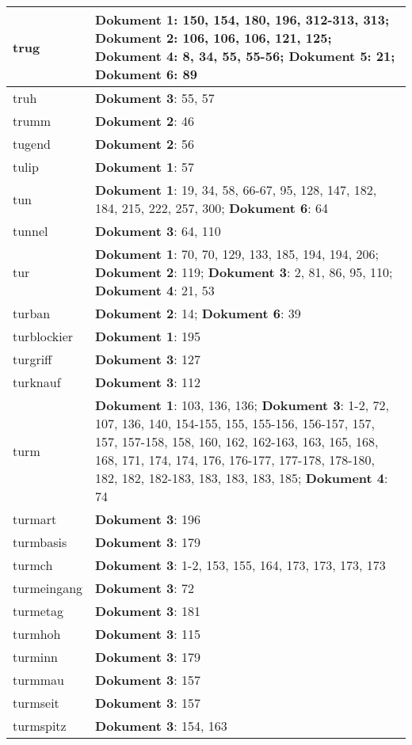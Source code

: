 \documentclass[a5paper]{article}
\begin{document}
\begin{longtable}[l]{|l|p{3in}|}
\hline
trug & \textbf{Dokument 1}: 150, 154, 180, 196, 312-313, 313; \textbf{Dokument 2}: 106, 106, 106, 121, 125; \textbf{Dokument 4}: 8, 34, 55, 55-56; \textbf{Dokument 5}: 21; \textbf{Dokument 6}: 89 \\
\hline
truh & \textbf{Dokument 3}: 55, 57 \\
\hline
trumm & \textbf{Dokument 2}: 46 \\
\hline
tugend & \textbf{Dokument 2}: 56 \\
\hline
tulip & \textbf{Dokument 1}: 57 \\
\hline
tun & \textbf{Dokument 1}: 19, 34, 58, 66-67, 95, 128, 147, 182, 184, 215, 222, 257, 300; \textbf{Dokument 6}: 64 \\
\hline
tunnel & \textbf{Dokument 3}: 64, 110 \\
\hline
tur & \textbf{Dokument 1}: 70, 70, 129, 133, 185, 194, 194, 206; \textbf{Dokument 2}: 119; \textbf{Dokument 3}: 2, 81, 86, 95, 110; \textbf{Dokument 4}: 21, 53 \\
\hline
turban & \textbf{Dokument 2}: 14; \textbf{Dokument 6}: 39 \\
\hline
turblockier & \textbf{Dokument 1}: 195 \\
\hline
turgriff & \textbf{Dokument 3}: 127 \\
\hline
turknauf & \textbf{Dokument 3}: 112 \\
\hline
turm & \textbf{Dokument 1}: 103, 136, 136; \textbf{Dokument 3}: 1-2, 72, 107, 136, 140, 154-155, 155, 155-156, 156-157, 157, 157, 157-158, 158, 160, 162, 162-163, 163, 165, 168, 168, 171, 174, 174, 176, 176-177, 177-178, 178-180, 182, 182, 182-183, 183, 183, 183, 185; \textbf{Dokument 4}: 74 \\
\hline
turmart & \textbf{Dokument 3}: 196 \\
\hline
turmbasis & \textbf{Dokument 3}: 179 \\
\hline
turmch & \textbf{Dokument 3}: 1-2, 153, 155, 164, 173, 173, 173, 173 \\
\hline
turmeingang & \textbf{Dokument 3}: 72 \\
\hline
turmetag & \textbf{Dokument 3}: 181 \\
\hline
turmhoh & \textbf{Dokument 3}: 115 \\
\hline
turminn & \textbf{Dokument 3}: 179 \\
\hline
turmmau & \textbf{Dokument 3}: 157 \\
\hline
turmseit & \textbf{Dokument 3}: 157 \\
\hline
turmspitz & \textbf{Dokument 3}: 154, 163 \\

\end{longtable}
\end{document}

